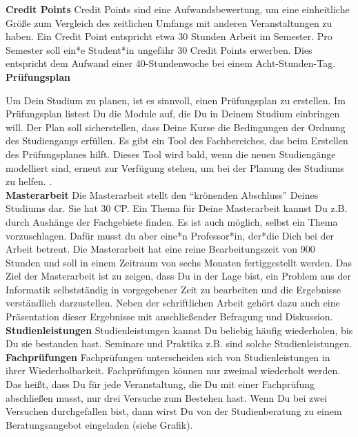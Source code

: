 {\noindent\textbf{Credit Points}
Credit Points sind eine Aufwandsbewertung, um eine einheitliche Größe zum Vergleich des zeitlichen Umfangs mit anderen Veranstaltungen zu haben. Ein Credit Point entspricht etwa 30 Stunden Arbeit im Semester. Pro Semester soll ein*e Student*in ungefähr 30 Credit Points erwerben. Dies entspricht dem Aufwand einer 40-Stundenwoche bei einem Acht-Stunden-Tag.\\


\noindent\textbf{Prüfungsplan}

Um Dein Studium zu planen, ist es sinnvoll, einen Prüfungsplan zu erstellen. Im Prüfungsplan listest Du  die Module auf, die Du in Deinem Studium einbringen will. Der Plan soll sicherstellen, dass Deine Kurse die Bedingungen der Ordnung des Studiengangs erfüllen. Es gibt ein Tool des Fachbereiches, das beim Erstellen des Prüfungsplanes hilft. Dieses Tool wird bald, wenn die neuen Studiengänge modelliert sind, erneut zur Verfügung stehen, um bei der Planung des Studiums zu helfen. \footnotemark[1].\\


\noindent\textbf{Masterarbeit}
Die Masterarbeit stellt den "`krönenden Abschluss"' Deines Studiums dar. Sie hat 30 CP. Ein Thema für Deine Masterarbeit kannst Du z.B. durch Aushänge der Fachgebiete finden. Es ist auch möglich, selbst ein Thema vorzuschlagen. Dafür musst du aber eine*n Professor*in, der*die Dich bei der Arbeit betreut. Die Masterarbeit hat eine reine Bearbeitungszeit von 900 Stunden und soll in einem Zeitraum von sechs Monaten fertiggestellt werden. Das Ziel der Masterarbeit ist zu zeigen, dass Du in der Lage bist, ein Problem aus der Informatik selbstständig in vorgegebener Zeit zu bearbeiten und die Ergebnisse verständlich darzustellen. Neben der schriftlichen Arbeit gehört dazu auch eine Präsentation dieser Ergebnisse mit anschließender Befragung und Diskussion.\\


\noindent\textbf{Studienleistungen}
Studienleistungen kannst Du beliebig häufig wiederholen, bis Du sie bestanden hast. Seminare und Praktika z.B. sind solche Studienleistungen.\\


\noindent\textbf{Fachprüfungen}
Fachprüfungen unterscheiden sich von Studienleistungen in ihrer Wiederholbarkeit. Fachprüfungen können nur zweimal wiederholt werden. Das heißt, dass Du für jede Veranstaltung, die Du mit einer Fachprüfung abschließen musst, nur drei Versuche zum Bestehen hast. Wenn Du bei zwei Versuchen durchgefallen bist, dann wirst Du von der Studienberatung zu einem Beratungsangebot eingeladen (siehe Grafik).

}
